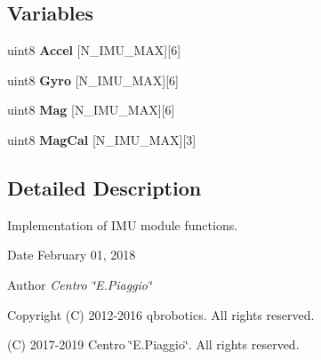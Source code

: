 \subsection*{Variables}
\begin{DoxyCompactItemize}
\item 
\mbox{\label{_i_m_u__functions_8c_a187c605f3898cf11e09f6f469c265920}} 
uint8 {\bfseries Accel} [N\+\_\+\+I\+M\+U\+\_\+\+M\+AX][6]
\item 
\mbox{\label{_i_m_u__functions_8c_a49dba88a31d1b3b4190065b9ef1649fe}} 
uint8 {\bfseries Gyro} [N\+\_\+\+I\+M\+U\+\_\+\+M\+AX][6]
\item 
\mbox{\label{_i_m_u__functions_8c_a5d88408ccb73729f049a52b4d1daaadf}} 
uint8 {\bfseries Mag} [N\+\_\+\+I\+M\+U\+\_\+\+M\+AX][6]
\item 
\mbox{\label{_i_m_u__functions_8c_a1e598e1bdae5fe927fbd1f396161f3a6}} 
uint8 {\bfseries Mag\+Cal} [N\+\_\+\+I\+M\+U\+\_\+\+M\+AX][3]
\end{DoxyCompactItemize}


\subsection{Detailed Description}
Implementation of I\+MU module functions. 

\begin{DoxyDate}{Date}
February 01, 2018 
\end{DoxyDate}
\begin{DoxyAuthor}{Author}
{\itshape Centro \char`\"{}\+E.\+Piaggio\char`\"{}} 
\end{DoxyAuthor}
\begin{DoxyCopyright}{Copyright}
(C) 2012-\/2016 qbrobotics. All rights reserved. 

(C) 2017-\/2019 Centro \char`\"{}\+E.\+Piaggio\char`\"{}. All rights reserved. 
\end{DoxyCopyright}
